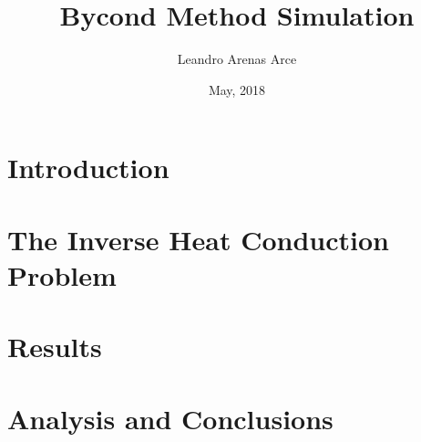 \documentclass[11pt, a4paper]{article}
\begin{document}
	
	\title{Bycond Method Simulation}
	\author{\centering Leandro Arenas Arce}
	\date{May, 2018}
	\maketitle
	
	\section{Introduction}
	
	
	\section{The Inverse Heat Conduction Problem}
	
	
	\section{Results}
	
	\section{Analysis and Conclusions}
\end{document}
